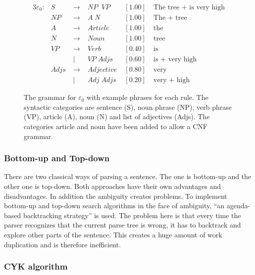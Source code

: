\documentclass[12pt,twoside]{scrartcl}
\theoremstyle{plain}
\theoremstyle{definition}
\theoremstyle{remark}
\begin{document}
		\begin{figure}
			\begin{alignat*}{3}
				\varepsilon_{0}:& S \;&\rightarrow &\; NP\;\;VP \;&[1.00]&\; \text{The tree + is very high} \\
				& NP \;&\rightarrow &\; A\;N \;&[1.00]&\; \text{The + tree}\\
				& A \;&\rightarrow &\; Article\;&[1.00]&\; \text{the}\\
				& N \;&\rightarrow &\; Noun\;&[1.00]&\; \text{tree}\\
				& VP \;&\rightarrow &\; Verb \;&[0.40]&\; \text{is} \\
				& \;&|&\; VP\;Adjs \;&[0.60]&\; \text{is + very high} \\
				& Adjs \;&\rightarrow &\; Adjective \;&[0.80]&\; \text{very} \\
				& \;&|&\; Adj\;Adjs \;&[0.20]&\; \text{very + high}
			\end{alignat*}
		
			\caption{The grammar for $\varepsilon_{0}$ with example phrases for each rule. The syntactic categories are sentence (S), noun phrase (NP), verb phrase (VP), article (A), noun (N) and list of adjectives (Adjs). The categories article and noun have been added to allow a CNF grammar.}
			\label{fig:grammar}
		\end{figure}
		
		\subsubsection*{Bottom-up and Top-down}
		\label{subSubSec:bottomUpTopDown}
		
		There are two classical ways of parsing a sentence. The one is bottom-up and the other one is top-down. Both approaches have their own advantages and disadvantages. In addition the ambiguity creates problems. To implement bottom-up and top-down search algorithms in the face of ambiguity, ``an agenda-based backtracking strategy''\cite[p.~468]{Jurafsky2009b} is used. The problem here is that every time the parser recognizes that the current parse tree is wrong, it has to backtrack and explore other parts of the sentence. This creates a huge amount of work duplication and is therefore inefficient.
		
		\subsubsection*{CYK algorithm}
		\label{subSubSec:cykAlgorithm}		
		
\end{document}
